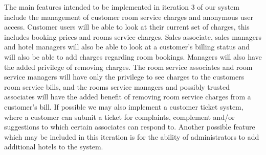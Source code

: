 The main features intended to be implemented in iteration 3 of our system include the management of customer room service charges and anonymous user access. Customer users will be able to look at their current set of charges, this includes booking prices and rooms service charges. Sales associate, sales managers and hotel managers will also be able to look at a customer's billing status and will also be able to add charges regarding room bookings. Managers will also have the added privilege of removing charges. The room service associates and room service managers will have only the privilege to see charges to the customers room service bills, and the rooms service managers and possibly trusted associates will have the added benefit of removing room service charges from a customer's bill. If possible we may also implement a customer ticket system, where a customer can submit a ticket for complaints, complement and/or suggestions to which certain associates can respond to. Another possible feature which may be included in this iteration is for the ability of administrators to add additional hotels to the system.
